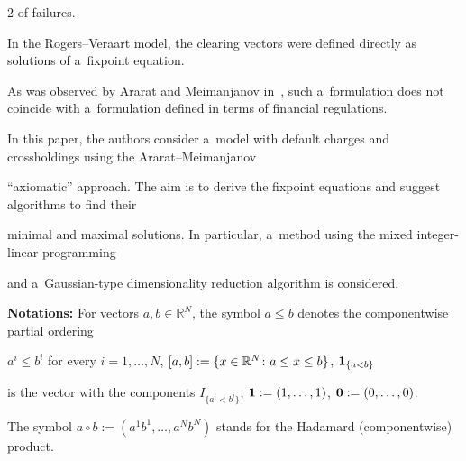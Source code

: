 \begin{multicols}{2}
of  failures. 

In the Rogers--Veraart model, the clearing vectors were defined directly as solutions of a~fixpoint equation.  

As was observed by Ararat and Meimanjanov in~\cite{Ararat2019}, such a~formulation does not coincide with a~formulation defined in terms  of financial regulations. 





In this paper, the authors consider  a~model with default charges and crossholdings using the Ararat--Meimanjanov

``axiomatic'' approach. The aim is to derive the fixpoint equations and suggest algorithms to find their 

minimal and maximal solutions.  In particular,  a~method using the mixed integer-linear programming

and  a~Gaussian-type dimensionality reduction algorithm is considered. 



\smallskip



\noindent

\textbf{Notations:} For vectors $a, b \in \mathbb{R}^N$, the symbol $a\le b$ denotes the componentwise partial ordering

 $a^i \leq b^i$ for every $i = 1, \dots, N$,  $[a,b]:=\{x\in 

\mathbb{R}^N\colon a\linebreak \le x\le b\}$, ${\bf 1}_{\{a<b\}}$

is the vector with the components  $I_{\{a^i< b^i\}}$,  ${\bf 1}:=(1,\dots,1)$, ${\bf 0}:=(0,\dots,0)$.    

The symbol  $a\circ b:=(a^1b^1,\dots,a^Nb^N)$ stands for the Hadamard (componentwise) product.  





 



\end{multicols}
